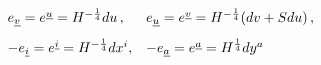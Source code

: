 \begin{equation}
\begin{array}{ll}
e_{\underline{v}}=e^{\underline{u}}=H^{-{\frac{1}{4}}}du\,, & e_{\underline{u%
}}=e^{\underline{v}}=H^{-{\frac{1}{4}}}(dv+Sdu)\,,
\\[3mm]
-e_{\underline{i}}=e^{\underline{i}}=H^{-{\frac{1}{4}}}dx^{i}, & -e_{%
\underline{a}}=e^{\underline{a}}=H^{\frac{1}{4}}dy^{a}
\end{array}
\end{equation}

